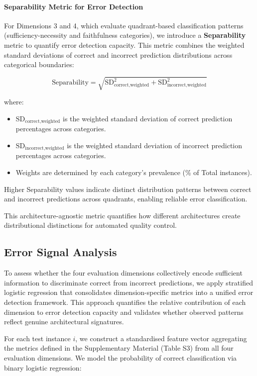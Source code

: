 \documentclass[preprint, times, review, 10pt]{elsarticle}
\begin{document}
\paragraph{Separability Metric for Error Detection}
For Dimensions 3 and 4, which evaluate quadrant-based classification patterns (sufficiency-necessity and faithfulness categories), we introduce a \textbf{Separability} metric to quantify error detection capacity. This metric combines the weighted standard deviations of correct and incorrect prediction distributions across categorical boundaries:

\[
\text{Separability} = \sqrt{\text{SD}^2_{\text{correct,weighted}} + \text{SD}^2_{\text{incorrect,weighted}}}
\]

where:
\begin{itemize}
    \item $\text{SD}_{\text{correct,weighted}}$ is the weighted standard deviation of correct prediction percentages across categories.
    \item $\text{SD}_{\text{incorrect,weighted}}$ is the weighted standard deviation of incorrect prediction percentages across categories.
    \item Weights are determined by each category's prevalence (\% of Total instances).
\end{itemize}

Higher Separability values indicate distinct distribution patterns between correct and incorrect predictions across quadrants, enabling reliable error classification.

This architecture-agnostic metric quantifies how different architectures create distributional distinctions for automated quality control.


\subsection{Error Signal Analysis} \label{logistic_regression}

To assess whether the four evaluation dimensions collectively encode sufficient information to discriminate correct from incorrect predictions, we apply stratified logistic regression that consolidates dimension-specific metrics into a unified error detection framework. This approach quantifies the relative contribution of each dimension to error detection capacity and validates whether observed patterns reflect genuine architectural signatures.

For each test instance \(i\), we construct a standardised feature vector aggregating the metrics defined in the Supplementary Material (Table S3) from all four evaluation dimensions. We model the probability of correct classification via binary logistic regression:
\end{document}
